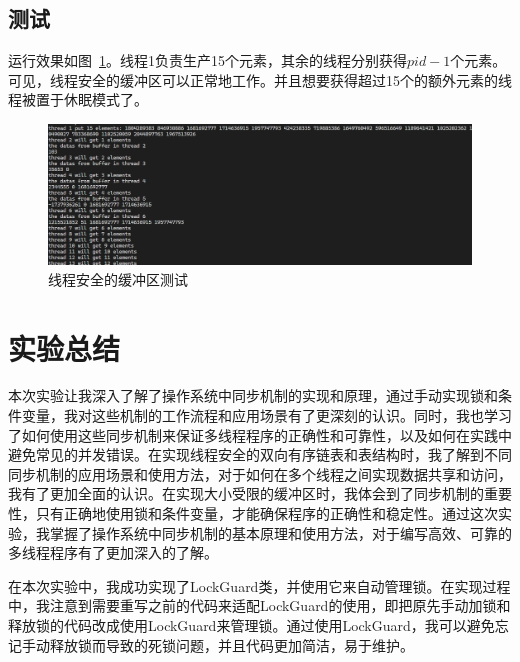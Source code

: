\documentclass[a4paper,twoside]{article}
\begin{document}
\begin{spacing}{1.2}
\subsection{测试}

运行效果如图~\ref{fig:buf}。线程1负责生产15个元素，其余的线程分别获得$pid-1$个元素。
可见，线程安全的缓冲区可以正常地工作。并且想要获得超过15个的额外元素的线程被置于休眠模式了。
\begin{figure}[H]
	\centering
	\caption{线程安全的缓冲区测试}
	\label{fig:buf}
	\includegraphics[width=0.6\linewidth]{bb.png}
\end{figure}

\newpage

\section{实验总结}


本次实验让我深入了解了操作系统中同步机制的实现和原理，通过手动实现锁和条件变量，我对这些机制的工作流程和应用场景有了更深刻的认识。同时，我也学习了如何使用这些同步机制来保证多线程程序的正确性和可靠性，以及如何在实践中避免常见的并发错误。在实现线程安全的双向有序链表和表结构时，我了解到不同同步机制的应用场景和使用方法，对于如何在多个线程之间实现数据共享和访问，我有了更加全面的认识。在实现大小受限的缓冲区时，我体会到了同步机制的重要性，只有正确地使用锁和条件变量，才能确保程序的正确性和稳定性。通过这次实验，我掌握了操作系统中同步机制的基本原理和使用方法，对于编写高效、可靠的多线程程序有了更加深入的了解。

在本次实验中，我成功实现了LockGuard类，并使用它来自动管理锁。在实现过程中，我注意到需要重写之前的代码来适配LockGuard的使用，即把原先手动加锁和释放锁的代码改成使用LockGuard来管理锁。通过使用LockGuard，我可以避免忘记手动释放锁而导致的死锁问题，并且代码更加简洁，易于维护。

\end{spacing}
\end{document}
